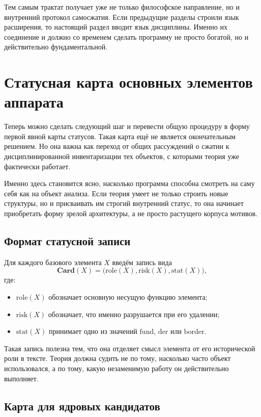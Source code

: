 \documentclass[12pt,a4paper]{article}
\begin{document}
Тем самым трактат получает уже не только философское направление, но и внутренний протокол самосжатия. Если предыдущие разделы строили язык расширения, то настоящий раздел вводит язык дисциплины. Именно их соединение и должно со временем сделать программу не просто богатой, но и действительно фундаментальной.

\section{Статусная карта основных элементов аппарата}

Теперь можно сделать следующий шаг и перевести общую процедуру в форму первой явной карты статусов. Такая карта ещё не является окончательным решением. Но она важна как переход от общих рассуждений о сжатии к дисциплинированной инвентаризации тех объектов, с которыми теория уже фактически работает.

Именно здесь становится ясно, насколько программа способна смотреть на саму себя как на объект анализа. Если теория умеет не только строить новые структуры, но и присваивать им строгий внутренний статус, то она начинает приобретать форму зрелой архитектуры, а не просто растущего корпуса мотивов.

\subsection{Формат статусной записи}

Для каждого базового элемента \(X\) введём запись вида
\begin{equation}
\mathbf{Card}(X)=\bigl(\mathrm{role}(X),\mathrm{risk}(X),\mathrm{stat}(X)\bigr),
\end{equation}
где:
\begin{itemize}
    \item \(\mathrm{role}(X)\) обозначает основную несущую функцию элемента;
    \item \(\mathrm{risk}(X)\) обозначает, что именно разрушается при его удалении;
    \item \(\mathrm{stat}(X)\) принимает одно из значений \(\mathrm{fund}\), \(\mathrm{der}\) или \(\mathrm{border}\).
\end{itemize}

Такая запись полезна тем, что она отделяет смысл элемента от его исторической роли в тексте. Теория должна судить не по тому, насколько часто объект использовался, а по тому, какую незаменимую работу он действительно выполняет.

\subsection{Карта для ядровых кандидатов}
\end{document}
